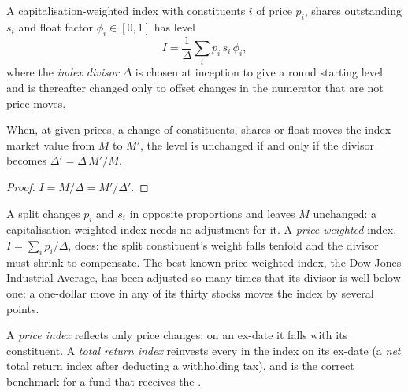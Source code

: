 \begin{definition}\label{def:m1:shares-corporate-actions-indices:divisor}
A capitalisation-weighted index with constituents $i$ of price $p_i$, shares
outstanding $s_i$ and float factor $\phi_i \in [0,1]$ has level
\[
I = \frac{1}{\Delta}\sum_i p_i\,s_i\,\phi_i ,
\]
where the \emph{index divisor} $\Delta$ is chosen at
inception to give a round starting level and is thereafter changed only to
offset changes in the numerator that are not price moves.
\end{definition}

\begin{proposition}\label{prop:m1:shares-corporate-actions-indices:divisoradj}
When, at given prices, a change of constituents, shares or float moves the
index market value from $M$ to $M'$, the level is unchanged if and only if
the divisor becomes $\Delta' = \Delta\,M'/M$.
\end{proposition}
\begin{proof}
$I = M/\Delta = M'/\Delta'$.
\end{proof}

A split changes $p_i$ and $s_i$ in opposite proportions and leaves $M$
unchanged: a capitalisation-weighted index needs no adjustment for it. A
\emph{price-weighted} index, $I = \sum_i p_i/\Delta$, does: the split
constituent's weight falls tenfold and the divisor must shrink to
compensate. The best-known price-weighted index, the Dow Jones Industrial
Average, has been adjusted so many times that its divisor is well below
one: a one-dollar move in any of its thirty stocks moves the index by
several points.

\begin{definition}\label{def:m1:shares-corporate-actions-indices:tri}
A \emph{price index} reflects only price changes: on an ex-date it falls
with its constituent. A \emph{total return index}
reinvests every  in the index on its ex-date (a \emph{net} total
return index after deducting a withholding tax), and is the correct benchmark
for a fund that receives the .
\end{definition}


